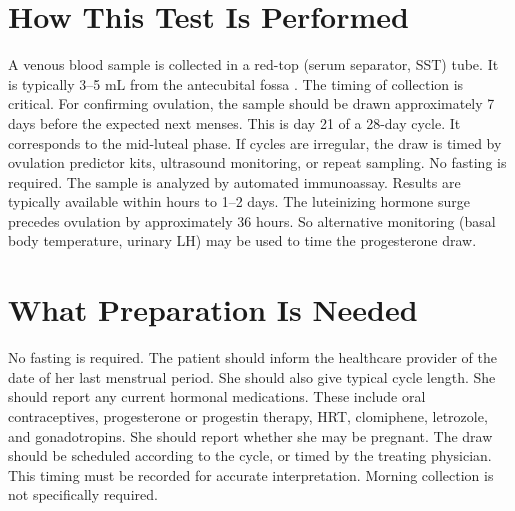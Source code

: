 \section*{How This Test Is Performed}
A venous blood sample is collected in a red-top (serum separator, SST) tube. It is typically 3--5 mL from the antecubital fossa \cite{fischbach2023manual}. The timing of collection is critical. For confirming ovulation, the sample should be drawn approximately 7 days before the expected next menses. This is day 21 of a 28-day cycle. It corresponds to the mid-luteal phase. If cycles are irregular, the draw is timed by ovulation predictor kits, ultrasound monitoring, or repeat sampling. No fasting is required. The sample is analyzed by automated immunoassay. Results are typically available within hours to 1--2 days. The luteinizing hormone surge precedes ovulation by approximately 36 hours. So alternative monitoring (basal body temperature, urinary LH) may be used to time the progesterone draw.

\section*{What Preparation Is Needed}
No fasting is required. The patient should inform the healthcare provider of the date of her last menstrual period. She should also give typical cycle length. She should report any current hormonal medications. These include oral contraceptives, progesterone or progestin therapy, HRT, clomiphene, letrozole, and gonadotropins. She should report whether she may be pregnant. The draw should be scheduled according to the cycle, or timed by the treating physician. This timing must be recorded for accurate interpretation. Morning collection is not specifically required.

